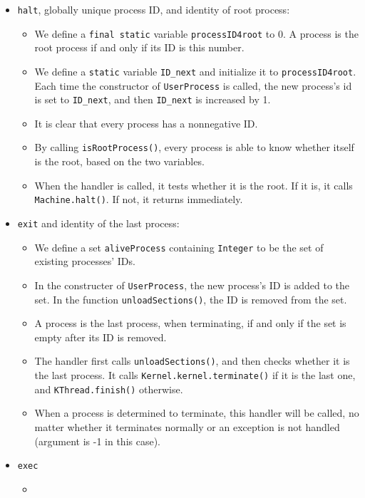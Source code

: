 \documentclass{article}
\begin{document}
\begin{itemize}
\item
\texttt{halt}, globally unique process ID, and identity of root process:
	\begin{itemize}
	\item
	We define a \texttt{final static} variable \texttt{processID4root} to 0.
	A process is the root process if and only if its ID is this number.
	\item
	We define a \texttt{static} variable \texttt{ID\_next} and initialize it to \texttt{processID4root}.
	Each time the constructor of \texttt{UserProcess} is called, the new process's id is set to \texttt{ID\_next}, and then \texttt{ID\_next} is increased by 1.
	\item
	It is clear that every process has a nonnegative ID.
	\item
	By calling \texttt{isRootProcess()}, every process is able to know whether itself is the root, based on the two variables.
	\item
	When the handler is called, it tests whether it is the root.
	If it is, it calls \texttt{Machine.halt()}. If not, it returns immediately.
	\end{itemize}
\item
\texttt{exit} and identity of the last process:
	\begin{itemize}
	\item
	We define a set \texttt{aliveProcess} containing \texttt{Integer} to be the set of existing processes' IDs.
	\item
	In the constructer of \texttt{UserProcess}, the new process's ID is added to the set.
	In the function \texttt{unloadSections()}, the ID is removed from the set.
	\item
	A process is the last process, when terminating, if and only if the set is empty after its ID is removed.
	\item
	The handler first calls \texttt{unloadSections()}, and then checks whether it is the last process.
	It calls \texttt{Kernel.kernel.terminate()} if it is the last one, and \texttt{KThread.finish()} otherwise.
	\item
	When a process is determined to terminate, this handler will be called, no matter whether it terminates normally or an exception is not handled (argument is -1 in this case).
	\end{itemize}
\item
\texttt{exec}
	\begin{itemize}
	\item

\end{itemize}
\end{itemize}
\end{document}
